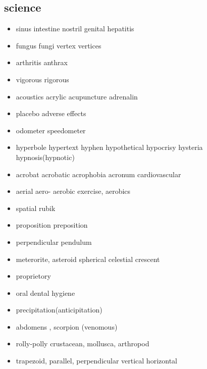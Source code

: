 \documentclass[a4paper,11pt,twoside]{book}
\begin{document}
\subsection{science}
\begin{itemize}
	\item sinus intestine nostril genital hepatitis 
	
	\item fungus fungi vertex vertices 
	
	\item arthritis anthrax 
	
	\item vigorous rigorous
	
	 
	
	\item acoustics acrylic acupuncture adrenalin
	
	\item placebo adverse effects 
	
	\item odometer speedometer
	
	\item hyperbole hypertext hyphen hypothetical hypocrisy hysteria hypnosis(hypnotic)
	
	\item acrobat acrobatic acrophobia acronum cardiovascular
	
	
	\item aerial aero-  aerobic exercise, aerobics
	
	\item spatial rubik
	
	\item proposition preposition
	
	\item perpendicular pendulum
	
	\item meterorite, asteroid spherical celestial crescent
	
	\item proprietory
	
	\item oral dental hygiene
	
	\item precipitation(anticipitation)
	
	\item abdomens , scorpion (venomous)
	
	\item rolly-polly crustacean, mollusca, arthropod
	
	\item trapezoid, parallel, perpendicular vertical horizontal 
	

\end{itemize}
\end{document}
